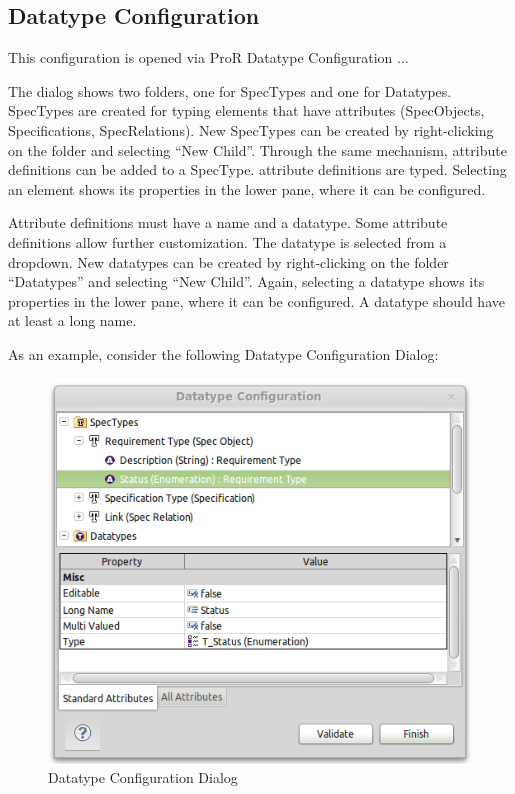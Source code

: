 \subsection{Datatype Configuration}

This configuration is opened via ProR \textbar{} Datatype Configuration
...

The dialog shows two folders, one for SpecTypes and one for Datatypes.
SpecTypes are created for typing elements that have attributes
(SpecObjects, Specifications, SpecRelations). New SpecTypes can be
created by right-clicking on the folder and selecting ``New Child''.
Through the same mechanism, attribute definitions can be added to a
SpecType. attribute definitions are typed. Selecting an element shows
its properties in the lower pane, where it can be configured.

Attribute definitions must have a name and a datatype. Some attribute
definitions allow further customization. The datatype is selected from a
dropdown. New datatypes can be created by right-clicking on the folder
``Datatypes'' and selecting ``New Child''. Again, selecting a datatype
shows its properties in the lower pane, where it can be configured. A
datatype should have at least a long name.

As an example, consider the following Datatype Configuration Dialog:

\begin{figure}[h!]
\centering      
\includegraphics[width=0.8\linewidth]{../rmf-images/pror_datatype_configuration.png}
\caption{Datatype Configuration Dialog}      
\label{fig:DatatypeConfig}
\end{figure}

